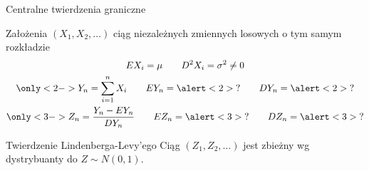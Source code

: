 \documentclass{mp}
\begin{document}
\begin{frame}{Centralne twierdzenia graniczne}
\begin{block}{Założenia}
$(X_1,X_2,\ldots)$ ciąg niezależnych zmiennych losowych o tym samym rozkładzie
\begin{gather*}
EX_i=\mu \qquad D^2X_i=\sigma^2\neq0 \\
\only<2->{Y_n=\sum_{i=1}^n X_i \qquad EY_n=\alert<2>{?} \qquad DY_n=\alert<2>{?}}\\
\only<3->{Z_n=\frac{Y_n-EY_n}{DY_n} \qquad EZ_n=\alert<3>{?} \qquad DZ_n=\alert<3>{?}}
\end{gather*}
\end{block}
{
\begin{block}{Twierdzenie Lindenberga-Levy'ego}
Ciąg $(Z_1,Z_2,\ldots)$ jest zbieżny wg dystrybuanty do $Z\sim N(0,1)$.
\end{block}
}
\end{frame}
\end{document}
